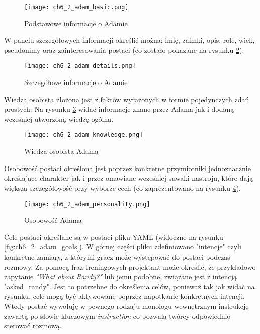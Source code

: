 \begin{figure}[h!]
    \centering
    \texttt{[image: ch6\_2\_adam\_basic.png]}
    \caption{Podstawowe informacje o Adamie}
    \label{fig:ch6_2_adam_basic}
\end{figure}

\newpage

W panelu szczegółowych informacji określić można: imię, zaimki, opis, role, wiek, pseudonimy oraz
zainteresowania postaci (co zostało pokazane na rysunku \ref{fig:ch6_2_adam_details}).

\begin{figure}[h!]
    \centering
    \texttt{[image: ch6\_2\_adam\_details.png]}
    \caption{Szczegółowe informacje o Adamie}
    \label{fig:ch6_2_adam_details}
\end{figure}

\newpage

Wiedza osobista złożona jest z faktów wyrażonych w formie pojedynczych zdań prostych. Na rysunku
\ref{fig:ch6_2_adam_knowledge} widać informacje znane przez Adama jak i dodaną wcześniej utworzoną
wiedzę ogólną.

\begin{figure}[h!]
    \centering
    \texttt{[image: ch6\_2\_adam\_knowledge.png]}
    \caption{Wiedza osobista Adama}
    \label{fig:ch6_2_adam_knowledge}
\end{figure}

Osobowość postaci określona jest poprzez konkretne przymiotniki jednoznacznie określające charakter jak i
przez omawiane wcześniej suwaki nastroju, które dają większą szczegółowość przy wyborze cech (co
zaprezentowano na rysunku \ref{fig:ch6_2_adam_personality}).

\begin{figure}[h!]
    \centering
    \texttt{[image: ch6\_2\_adam\_personality.png]}
    \caption{Osobowość Adama}
    \label{fig:ch6_2_adam_personality}
\end{figure}

\newpage

Cele postaci określane są w postaci pliku YAML (widoczne na rysunku \ref{fig:ch6_2_adam_goals}). W górnej
części pliku zdefiniowano "intencje" czyli konkretne zamiary, z którymi gracz może występować do postaci
podczas rozmowy. Za pomocą fraz treningowych projektant może określić, że przykładowo zapytanie
\textit{"What about Randy?"} lub jemu podobne, związane jest z intencją "asked\_randy". Jest to potrzebne
do określenia celów, ponieważ tak jak widać na rysunku, cele mogą być aktywowane poprzez napotkanie
konkretnych intencji. Wtedy postać wywołuję w pewnego rodzaju monologu wewnętrznym instrukcję zawartą
po słowie kluczowym \textit{instruction} co pozwala twórcy odpowiednio sterować rozmową.

